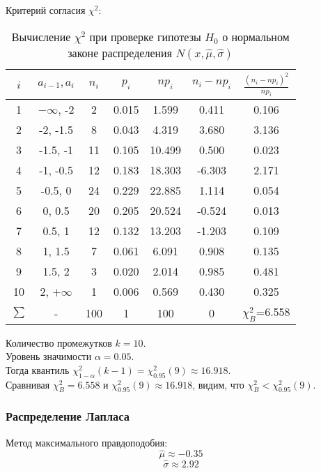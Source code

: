 Критерий согласия $\chi^2$:
\begin{table}[h]
	\centering
		\begin{tabular} {|c|c|c|c|c|c|c|}
			\hline
			$i$ & $a_{i-1}, a_i$ & $n_i$ & $p_i$ & $np_i$ & $n_i-np_i$ & $\frac{(n_i-np_i)^2}{np_i}$ \\ \hline
			1 & $-\infty$, -2 & 2 & 0.015 & 1.599 & 0.411 & 0.106 \\ \hline
			2 & -2, -1.5 & 8 & 0.043 & 4.319 & 3.680 & 3.136 \\ \hline
			3 & -1.5, -1 & 11 & 0.105 & 10.499 & 0.500 & 0.023 \\ \hline
			4 & -1, -0.5 & 12 & 0.183 & 18.303 & -6.303 & 2.171 \\ \hline
			5 & -0.5, 0 & 24 & 0.229 & 22.885 & 1.114 & 0.054 \\ \hline
			6 & 0, 0.5 & 20 & 0.205 & 20.524 & -0.524 & 0.013 \\ \hline
			7 & 0.5, 1 & 12 & 0.132 & 13.203 & -1.203 & 0.109 \\ \hline
			8 & 1, 1.5 & 7 & 0.061 & 6.091 & 0.908 & 0.135 \\ \hline
			9 & 1.5, 2 & 3 & 0.020 & 2.014 & 0.985 & 0.481 \\ \hline
			10 & 2, $+\infty$ & 1 & 0.006 & 0.569 & 0.430 & 0.325 \\ \hline
			$\sum$ & - & 100 & 1 & 100 & 0 & $\chi_B^2$=6.558 \\ \hline
		\end{tabular}
		\caption{Вычисление $\chi^2$ при проверке гипотезы $H_0$ о нормальном законе распределения $N(x, \widehat{\mu}, \widehat{\sigma})$}
\end{table}

Количество промежутков $k=10$.\\

Уровень значимости $\alpha=0.05$.\\

Тогда квантиль $\chi_{1-\alpha}^2(k-1)=\chi_{0.95}^2(9)\approx16.918$.\\

Сравнивая $\chi_B^2=6.558$ и $\chi_{0.95}^2(9)\approx16.918$, видим, что $\chi_B^2<\chi_{0.95}^2(9)$.

\subsubsection{Распределение Лапласа}
Метод максимального правдоподобия:
\begin{equation}
\widehat{\mu}\approx-0.35
\end{equation}
\begin{equation}
\widehat{\sigma}\approx2.92
\end{equation}

